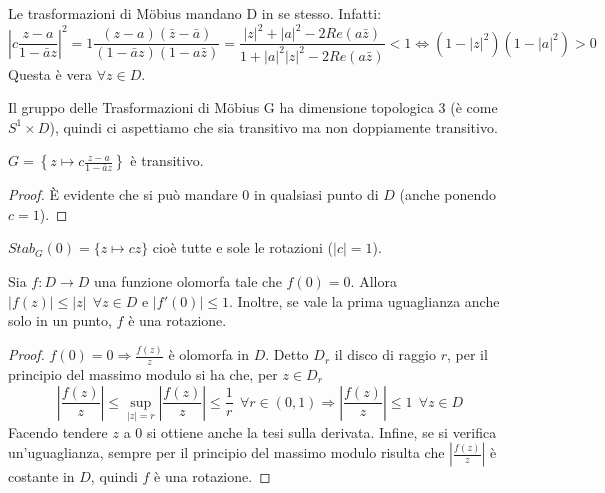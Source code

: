 \begin{osservazione}
Le trasformazioni di Möbius mandano D in se stesso. Infatti:
$$\left|c \frac{z-a}{1- \bar{a}z} \right|^2 = 1 \frac{(z-a)(\bar{z}-\bar{a})}{(1- \bar{a}z)({1- a\bar{z}})}=
\frac{|z|^2 + |a|^2 - 2Re(a \bar{z})}{1+ |a|^2 |z|^2 - 2Re(a \bar{z})} <1
\Longleftrightarrow \left( 1-|z|^2 \right) \left( 1-|a|^2 \right) >0$$
Questa è vera $\forall z \in D$.
\end{osservazione}

\begin{osservazione}
Il gruppo delle Trasformazioni di Möbius G ha dimensione topologica 3 (è come $S^1 \times D$),
quindi ci aspettiamo che sia transitivo ma non doppiamente transitivo.
\end{osservazione}

\begin{lemma}
$G= \left \{ z \mapsto \displaystyle{c \frac{z-a}{1- \bar{a}z}} \right \}$ è transitivo.
\end{lemma}
\begin{proof}
È evidente che si può mandare $0$ in qualsiasi punto di $D$ (anche ponendo $c=1$).
\end{proof}

\begin{osservazione}
$Stab_G (0) = \{z \mapsto cz \}$ cioè tutte e sole le rotazioni ($|c| = 1$).
\end{osservazione}

\begin{lemma}[di Schwarz]
Sia $f:D\rightarrow D$ una funzione olomorfa tale che $f(0)=0$.
Allora $|f(z)| \leq |z|\ \ \forall z \in D$ e $|f'(0)| \leq 1$. Inoltre, se vale la prima uguaglianza anche solo in un punto, $f$ è una rotazione.
\end{lemma}
\begin{proof}
$f(0)=0 \Rightarrow \frac{f(z)}{z}$ è olomorfa in $D$. Detto $D_r$ il disco di raggio $r$,
per il principio del massimo modulo si ha che, per $z \in D_r$
$$\left| \frac{f(z)}{z} \right| \leq \sup_{|z|=r} \left| \frac{f(z)}{z} \right| \leq \frac{1}{r} \ \  \forall r \in (0,1)
\Longrightarrow \left| \frac{f(z)}{z} \right| \leq 1 \ \ \forall z \in D$$
Facendo tendere $z$ a $0$ si ottiene anche la tesi sulla derivata.
Infine, se si verifica un'uguaglianza, sempre per il principio del massimo modulo risulta che
$\left| \frac{f(z)}{z} \right|$ è costante in $D$, quindi $f$ è una rotazione.
\end{proof}


